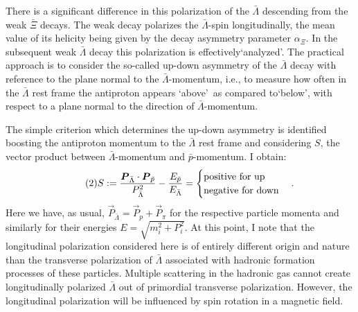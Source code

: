 \begin{mdframed}[linecolor=gray,roundcorner=12pt,backgroundcolor=Dandelion!15,linewidth=1pt,leftmargin=0cm,rightmargin=0cm,topline=true,bottomline=true,skipabove=12pt]
There is a significant difference in this polarization of the $\bar \Lambda$ descending from the weak $\bar \Xi$ decays. The weak decay polarizes the $\bar \Lambda$-spin longitudinally, the mean value of its helicity being given by the decay asymmetry parameter $\alpha_\Xi$. In the subsequent weak $\bar \Lambda$ decay this polarization is effectively\lq analyzed\rq. The practical approach is to consider the so-called up-down asymmetry of the $\bar \Lambda$ decay with reference to the plane normal to the $\bar \Lambda$-momentum, i.e., to measure how often in the $\bar \Lambda$ rest frame the antiproton appears `above\rq\ as compared to\lq below\rq\;, with respect to a plane normal to the direction of $\bar \Lambda$-momentum.  

The simple criterion which determines the up-down asymmetry is identified boosting the antiproton momentum to the $\bar \Lambda$ rest frame and considering $S$, the vector product between $\bar \Lambda$-momentum and $\bar p$-momentum. I obtain: 
\begin{equation} \tag{2}
S:= \displaystyle\frac{\vec P_{\bar \Lambda} \cdot \vec P_{\bar p}}{P_{\bar \Lambda}^2} -\displaystyle\frac{E_{\bar p}}{E_{\bar \Lambda}}= 
\begin{cases}  \mbox{positive for up}\cr 
\mbox{negative for down}\cr
\end{cases}. 
\end{equation} 
Here we have, as usual, $\vec P_{\bar \Lambda} = \vec P_p + \vec P_\pi$ for the respective particle momenta and similarly for their energies $E = \sqrt{m_i^2 + P_i^2}$. At this point, I note that the longitudinal polarization considered here is of entirely different origin and nature than the transverse polarization of $\bar \Lambda$ associated with hadronic formation processes of these particles. Multiple scattering in the hadronic gas cannot create longitudinally polarized $\bar \Lambda$ out of primordial transverse polarization. However, the longitudinal polarization will be influenced by spin rotation in a magnetic field.  


\end{mdframed}
